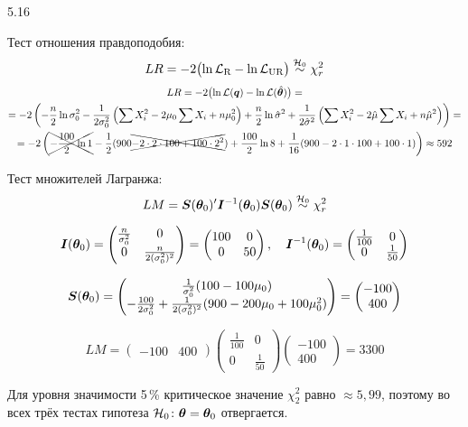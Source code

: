 \begin{solution}{{5.16}}
\begin{enumerate}
Тест отношения правдоподобия:
\[
LR = -2 \bigl( \ln \mathcal{L}_{\text{R}} - \ln \mathcal{L}_{\text{UR}} \bigr) \mathrel{\stackrel{\mathcal{H}_0}{\sim}} \chi^2_r
\]
\begin{multline*}
LR =  -2 \bigl( \ln \mathcal{L}(\boldsymbol{q}) - \ln \mathcal{L}(\hat{\boldsymbol{\theta}}) \bigr) = \\
 = -2 \left( -\frac{n}{2} \ln \sigma^2_0 - \frac{1}{2\sigma^2_0} \left( \sum X_i^2 - 2\mu_0 \sum X_i + n \mu^2_0\right) + \frac{n}{2} \ln \hat\sigma^2 + \frac{1}{2\hat\sigma^2} \left( \sum X_i^2 - 2\hat\mu \sum X_i + n \hat\mu^2\right) \right) = \\
= -2 \left( \xcancel{- \frac{100}{2} \ln 1} - \frac{1}{2} ( 900 \xcancel{- 2\cdot 2 \cdot 100 + 100\cdot 2^2}) +  \frac{100}{2} \ln 8 + \frac{1}{16} ( 900 - 2\cdot 1 \cdot 100 + 100\cdot 1)  \right) \approx 592
\end{multline*}

Тест множителей Лагранжа:
\[
LM = \boldsymbol{S}(\boldsymbol{\theta}_0)' \boldsymbol{I}^{-1}(\boldsymbol{\theta}_{0}) \boldsymbol{S}(\boldsymbol{\theta}_{0}) \mathrel{\stackrel{\mathcal{H}_0}{\sim}} \chi^2_r
\]

\[
\boldsymbol{I}(\boldsymbol{\theta}_0) = \begin{pmatrix}  \frac{n}{\sigma^2_0} & 0 \\ 0  & \frac{n}{2(\sigma^2_0)^2} \end{pmatrix} = \begin{pmatrix}  100 & 0 \\ 0  & 50 \end{pmatrix}, \quad \boldsymbol{I}^{-1}(\boldsymbol{\theta}_0) = \begin{pmatrix}  \frac{1}{100} & 0 \\ 0  & \frac{1}{50} \end{pmatrix}\]

\[\boldsymbol{S}(\boldsymbol{\theta}_0) =  \begin{pmatrix} \frac{1}{\sigma^2_0 } (100-100\mu_0) \\ -\frac{100}{2\sigma^2_0} + \frac{1}{2(\sigma_0^2)^2 } (900 - 200\mu_0 + 100\mu_0^2)  \end{pmatrix} = \begin{pmatrix} -100 \\ 400 \end{pmatrix}
\]


\[
LM =  \begin{pmatrix} -100 & 400 \end{pmatrix}  \begin{pmatrix}  \frac{1}{100} & 0 \\ 0  & \frac{1}{50} \end{pmatrix}  \begin{pmatrix} -100 \\ 400 \end{pmatrix} = 3300
\]

Для уровня значимости 5\,\% критическое значение $\chi^2_2$ равно $\approx5{,}99$, поэтому во всех трёх тестах гипотеза $\mathcal{H}_0\colon \boldsymbol{\theta}=\boldsymbol{\theta}_0$ отвергается.

\end{enumerate}
\end{solution}
